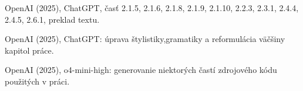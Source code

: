 \begin{trivlist}
\item OpenAI (2025), ChatGPT, časť 2.1.5, 2.1.6, 2.1.8, 2.1.9, 2.1.10, 2.2.3, 2.3.1, 2.4.4, 2.4.5, 2.6.1, preklad textu.

\item OpenAI (2025), ChatGPT: úprava štylistiky,gramatiky a reformulácia väčšiny kapitol práce.

\item OpenAI (2025), o4-mini-high: generovanie niektorých častí zdrojového kódu použitých v práci.

\end{trivlist}
